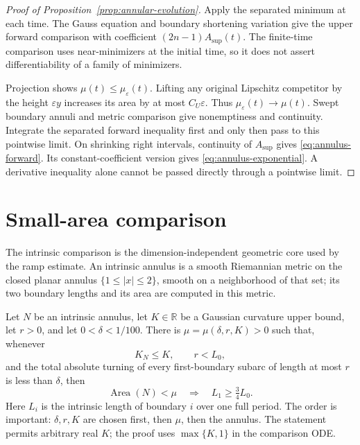 \begin{proof}[Proof of Proposition~\ref{prop:annular-evolution}]
Apply the separated minimum at each time. The Gauss equation and
boundary shortening variation give the upper forward comparison
with coefficient $(2n-1)A_{\sup}(t)$. The finite-time comparison
uses near-minimizers at the initial time, so it does not assert
differentiability of a family of minimizers.

Projection shows $\mu(t)\leq\mu_\varepsilon(t)$. Lifting any original
Lipschitz competitor by the height $\varepsilon y$ increases its
area by at most $C_U\varepsilon$. Thus
$\mu_\varepsilon(t)\to\mu(t)$. Swept boundary annuli and metric
comparison give nonemptiness and continuity. Integrate the
separated forward inequality first and only then pass to this
pointwise limit. On shrinking right intervals, continuity of
$A_{\sup}$ gives \eqref{eq:annulus-forward}. Its constant-coefficient
version gives \eqref{eq:annulus-exponential}. A derivative inequality
alone cannot be passed directly through a pointwise limit.
\end{proof}

\section{Small-area comparison}
\label{sec:small-area}

The intrinsic comparison is the dimension-independent geometric core used by
the ramp estimate.  An intrinsic annulus is a smooth Riemannian metric on
the closed planar annulus $\{1\le |x|\le2\}$, smooth on a neighborhood
of that set; its two boundary lengths and its area are computed in this metric.
\begin{proposition}
\label{prop:intrinsic-annular}
Let $N$ be an intrinsic annulus, let $K\in\mathbb R$ be
a Gaussian curvature upper bound, let $r>0$, and let
$0<\delta<1/100$.  There is $\mu=\mu(\delta,r,K)>0$ such that, whenever
\[
 K_N\le K,\qquad r<L_0,
\]
and the total absolute turning of every first-boundary subarc of length at
most $r$ is less than $\delta$, then
\begin{equation}
 \operatorname{Area}(N)<\mu
 \quad\Longrightarrow\quad
 L_1\ge\tfrac34L_0.
 \label{eq:intrinsic-comparison}
\end{equation}
Here $L_i$ is the intrinsic length of boundary $i$ over one full period.
The order is important: $\delta,r,K$ are chosen first,
then $\mu$, then the annulus.  The statement permits arbitrary real
$K$; the proof uses $\max\{K,1\}$ in the comparison ODE.
\end{proposition}

